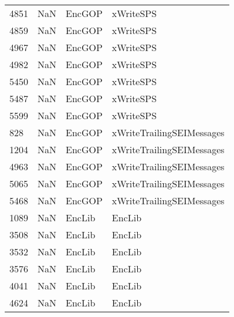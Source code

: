 \begin{tabular}{llll}
4851 &                   NaN &                     EncGOP &                                 xWriteSPS \\
4859 &                   NaN &                     EncGOP &                                 xWriteSPS \\
4967 &                   NaN &                     EncGOP &                                 xWriteSPS \\
4982 &                   NaN &                     EncGOP &                                 xWriteSPS \\
5450 &                   NaN &                     EncGOP &                                 xWriteSPS \\
5487 &                   NaN &                     EncGOP &                                 xWriteSPS \\
5599 &                   NaN &                     EncGOP &                                 xWriteSPS \\
828  &                   NaN &                     EncGOP &                 xWriteTrailingSEIMessages \\
1204 &                   NaN &                     EncGOP &                 xWriteTrailingSEIMessages \\
4963 &                   NaN &                     EncGOP &                 xWriteTrailingSEIMessages \\
5065 &                   NaN &                     EncGOP &                 xWriteTrailingSEIMessages \\
5468 &                   NaN &                     EncGOP &                 xWriteTrailingSEIMessages \\
1089 &                   NaN &                     EncLib &                                    EncLib \\
3508 &                   NaN &                     EncLib &                                    EncLib \\
3532 &                   NaN &                     EncLib &                                    EncLib \\
3576 &                   NaN &                     EncLib &                                    EncLib \\
4041 &                   NaN &                     EncLib &                                    EncLib \\
4624 &                   NaN &                     EncLib &                                    EncLib \\

\end{tabular}
